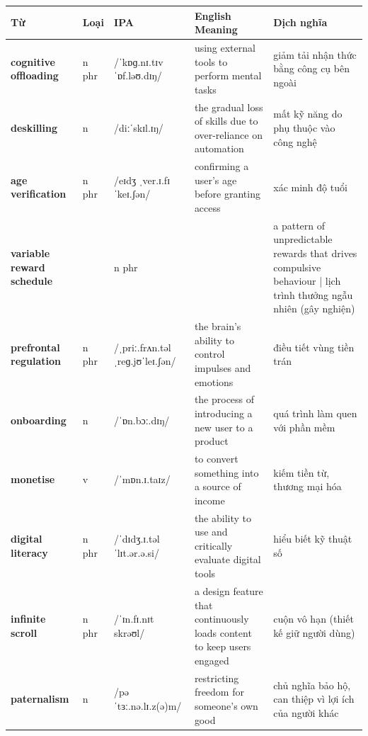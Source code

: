 \vspace{0.8em}
\begin{center}
\renewcommand{\arraystretch}{1.65}
\begin{tabularx}{\textwidth}{|V{0.22\textwidth}|C{0.07\textwidth}|I{0.20\textwidth}|Y|V{0.18\textwidth}|}
\hline
{}
\textbf{Từ} & \textbf{Loại} & \textbf{IPA} & \textbf{English Meaning} & \textbf{Dịch nghĩa} \\
\hline
\textbf{cognitive offloading} & n phr & /ˈkɒɡ.nɪ.tɪv ˈɒf.ləʊ.dɪŋ/ & using external tools to perform mental tasks & giảm tải nhận thức bằng công cụ bên ngoài \\ \hline
\textbf{deskilling} & n & /diːˈskɪl.ɪŋ/ & the gradual loss of skills due to over-reliance on automation & mất kỹ năng do phụ thuộc vào công nghệ \\ \hline
\textbf{age verification} & n phr & /eɪdʒ ˌver.ɪ.fɪˈkeɪ.ʃən/ & confirming a user's age before granting access & xác minh độ tuổi \\ \hline
\textbf{variable reward schedule} & & n phr & & a pattern of unpredictable rewards that drives compulsive behaviour | lịch trình thưởng ngẫu nhiên (gây nghiện) \\ \hline
\textbf{prefrontal regulation} & n phr & /ˌpriː.frʌn.təl ˌreɡ.jʊˈleɪ.ʃən/ & the brain's ability to control impulses and emotions & điều tiết vùng tiền trán \\ \hline
\textbf{onboarding} & n & /ˈɒn.bɔː.dɪŋ/ & the process of introducing a new user to a product & quá trình làm quen với phần mềm \\ \hline
\textbf{monetise} & v & /ˈmɒn.ɪ.taɪz/ & to convert something into a source of income & kiếm tiền từ, thương mại hóa \\ \hline
\textbf{digital literacy} & n phr & /ˈdɪdʒ.ɪ.təl ˈlɪt.ər.ə.si/ & the ability to use and critically evaluate digital tools & hiểu biết kỹ thuật số \\ \hline
\textbf{infinite scroll} & n phr & /ˈɪn.fɪ.nɪt skrəʊl/ & a design feature that continuously loads content to keep users engaged & cuộn vô hạn (thiết kế giữ người dùng) \\ \hline
\textbf{paternalism} & n & /pəˈtɜː.nə.lɪ.z(ə)m/ & restricting freedom for someone's own good & chủ nghĩa bảo hộ, can thiệp vì lợi ích của người khác \\ \hline
\end{tabularx}
\end{center}

